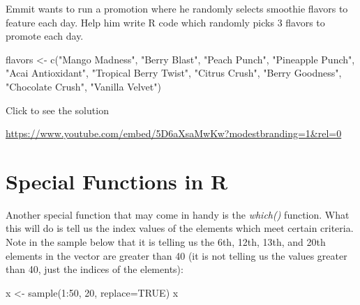 \documentclass[
  letterpaper,
  DIV=11,
  numbers=noendperiod]{scrreprt}
\newenvironment{Shaded}{\begin{snugshade}}{\end{snugshade}}
\newcommand{\AttributeTok}[1]{\textcolor[rgb]{0.40,0.45,0.13}{#1}}
\newcommand{\ConstantTok}[1]{\textcolor[rgb]{0.56,0.35,0.01}{#1}}
\newcommand{\DecValTok}[1]{\textcolor[rgb]{0.68,0.00,0.00}{#1}}
\newcommand{\FunctionTok}[1]{\textcolor[rgb]{0.28,0.35,0.67}{#1}}
\newcommand{\NormalTok}[1]{\textcolor[rgb]{0.00,0.23,0.31}{#1}}
\newcommand{\OtherTok}[1]{\textcolor[rgb]{0.00,0.23,0.31}{#1}}
\newcommand{\SpecialCharTok}[1]{\textcolor[rgb]{0.37,0.37,0.37}{#1}}
\newcommand{\StringTok}[1]{\textcolor[rgb]{0.13,0.47,0.30}{#1}}
\begin{document}
\begin{tcolorbox}[enhanced jigsaw, leftrule=.75mm, arc=.35mm, coltitle=black, rightrule=.15mm, bottomrule=.15mm, toprule=.15mm, left=2mm, colbacktitle=quarto-callout-tip-color!10!white, title=\textcolor{quarto-callout-tip-color}{\faLightbulb}\hspace{0.5em}{Try it Out}, toptitle=1mm, breakable, colframe=quarto-callout-tip-color-frame, bottomtitle=1mm, titlerule=0mm, colback=white, opacityback=0, opacitybacktitle=0.6]

Emmit wants to run a promotion where he randomly selects smoothie
flavors to feature each day. Help him write R code which randomly picks
3 flavors to promote each day.

\begin{Shaded}
\begin{Highlighting}[]
\NormalTok{flavors }\OtherTok{\textless{}{-}} \FunctionTok{c}\NormalTok{(}\StringTok{"Mango Madness"}\NormalTok{, }\StringTok{"Berry Blast"}\NormalTok{, }\StringTok{"Peach Punch"}\NormalTok{, }\StringTok{"Pineapple Punch"}\NormalTok{, }
             \StringTok{"Acai Antioxidant"}\NormalTok{, }\StringTok{"Tropical Berry Twist"}\NormalTok{, }\StringTok{"Citrus Crush"}\NormalTok{, }
             \StringTok{"Berry Goodness"}\NormalTok{, }\StringTok{"Chocolate Crush"}\NormalTok{, }\StringTok{"Vanilla Velvet"}\NormalTok{)}
\end{Highlighting}
\end{Shaded}

Click to see the solution

\url{https://www.youtube.com/embed/5D6aXsaMwKw?modestbranding=1&rel=0}

\end{tcolorbox}

\section{Special Functions in R}\label{special-functions-in-r}

Another special function that may come in handy is the \emph{which()}
function. What this will do is tell us the index values of the elements
which meet certain criteria. Note in the sample below that it is telling
us the 6th, 12th, 13th, and 20th elements in the vector are greater than
40 (it is not telling us the values greater than 40, just the indices of
the elements):

\begin{Shaded}
\begin{Highlighting}[]
\NormalTok{x }\OtherTok{\textless{}{-}} \FunctionTok{sample}\NormalTok{(}\DecValTok{1}\SpecialCharTok{:}\DecValTok{50}\NormalTok{, }\DecValTok{20}\NormalTok{, }\AttributeTok{replace=}\ConstantTok{TRUE}\NormalTok{)}
\NormalTok{x}
\end{Highlighting}
\end{Shaded}
\end{document}
